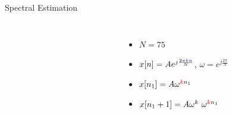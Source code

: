 \documentclass[10pt,xcolor=table]{beamer}
\begin{document}
%	
%		
%		
%
\begin{frame}{Spectral Estimation}
	
	\begin{columns}
		
		\begin{figure}
			\centering
			\scalebox{0.60}{}
		\end{figure}
		
		\begin{figure}
			\centering
			\scalebox{0.60}{}
		\end{figure}

        \begin{itemize}
        \item $N=75$
        \item $x[n] = A e^{j \frac{2 \pi {\color{blue}{k}} n}{N}}$, $\omega = e^{j \frac{2 \pi}{N}}$
        \item $x[n_1] = A \omega^{{\color{red}{k}}n_1}$
        \item $x[n_1+1] = A \omega^k \ \omega^{{\color{red}{k}}n_1}$
		\end{itemize}
	\end{columns}	
\end{frame}
\end{document}
